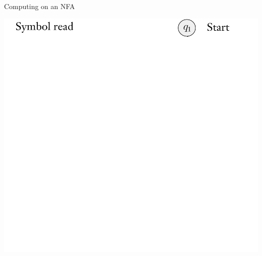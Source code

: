 \documentclass[aspectratio=169]{beamer}
\begin{document}
\begin{frame}{Computing on an NFA}
    \begin{center}
        \includegraphics[scale=0.80]{N1_compute/N1_0.png}
    \end{center}
\end{frame}
\end{document}
